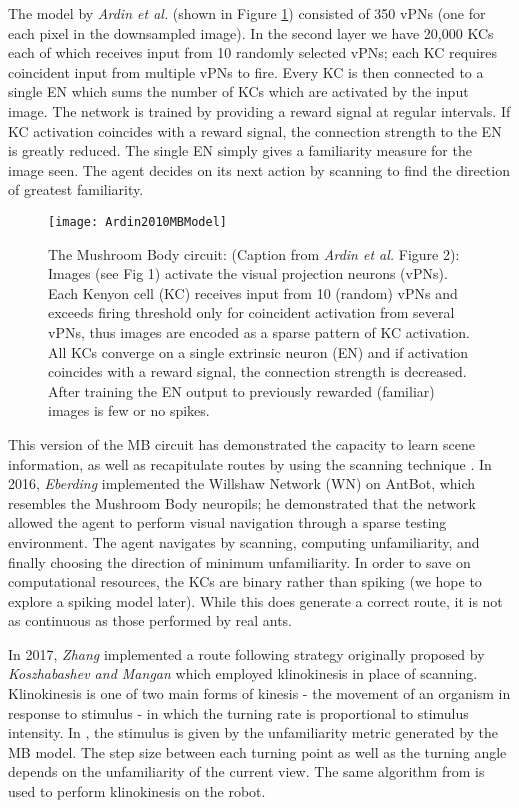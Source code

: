 \documentclass[a4paper,12pt]{article}
\begin{document}
The model by \textit{Ardin et al.} (shown in Figure \ref{fig:ardinmb}) consisted of 350 vPNs
(one for each pixel in the downsampled image). In the second layer we have 20,000 KCs each of
which receives input from 10 randomly selected vPNs; each KC requires coincident input from multiple
vPNs to fire. Every KC is then connected to a single EN which sums the number of KCs which are
activated by the input image. The network is trained by providing a reward signal at regular
intervals. If KC activation coincides with a reward signal, the connection strength to the EN is
greatly reduced. The single EN simply gives a familiarity measure for the image seen. The agent
decides on its next action by scanning to find the direction of greatest familiarity.
\newline

\begin{figure}
  \centering
  \texttt{[image: Ardin2010MBModel]}
  \caption{
    \label{fig:ardinmb} The Mushroom Body circuit: (Caption from \textit{Ardin et al.} Figure 2):
    Images (see Fig 1) activate the visual projection neurons (vPNs). Each Kenyon cell (KC) receives
    input from 10 (random) vPNs and exceeds firing threshold only for coincident activation from
    several vPNs, thus images are encoded as a sparse pattern of KC activation. All KCs converge on
    a single extrinsic neuron (EN) and if activation coincides with a reward signal, the connection
    strength is decreased. After training the EN output to previously rewarded (familiar) images is
    few or no spikes.
  }
\end{figure}

This version of the MB circuit has demonstrated the capacity to learn scene information, as well
as recapitulate routes by using the scanning technique \cite{Ardin2016}. In 2016, \textit{Eberding}
implemented the Willshaw Network (WN) on AntBot, which resembles the Mushroom Body neuropils; he
demonstrated that the network allowed the agent to perform visual navigation through a sparse testing
environment\cite{Eberding2016}. The agent navigates by scanning, computing unfamiliarity, and finally
choosing the direction of minimum unfamiliarity. In order to save on computational resources, the
KCs are binary rather than spiking (we hope to explore a spiking model later). While this does
generate a correct route, it is not as continuous as those performed by real ants.
\newline

In 2017, \textit{Zhang} implemented a route following strategy originally proposed by
\textit{Koszhabashev and Mangan} which employed klinokinesis in place of scanning. Klinokinesis
is one of two main forms of kinesis - the movement of an organism in response to stimulus - in which
the turning rate is proportional to stimulus intensity. In \cite{Zhang2017}, the
stimulus is given by the unfamiliarity metric generated by the MB model. The step size between each
turning point as well as the turning angle depends on the unfamiliarity of the current view. The same
algorithm from \cite{Kodzhabashev2015} is used to perform klinokinesis on the robot.
\newline
\end{document}
